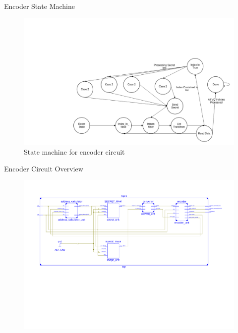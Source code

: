 \documentclass[10pt, compress]{beamer}
\begin{document}
\begin{frame}{Encoder State Machine}

    \begin{figure}
    \centering
    \includegraphics[scale=0.25]{encoder_states.png}
    \caption{State machine for encoder circuit}
    \end{figure}

\end{frame}

\begin{frame}{Encoder Circuit Overview}
    
    \begin{figure}
    \centering
    \includegraphics[scale=0.43]{top.pdf}
    \end{figure}
    

\end{frame}
\end{document}
